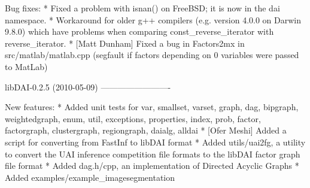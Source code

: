 \begin{DoxyVerbInclude}
Bug fixes:
* Fixed a problem with isnan() on FreeBSD; it is now in the dai namespace.
* Workaround for older g++ compilers (e.g. version 4.0.0 on Darwin 9.8.0)
  which have problems when comparing const_reverse_iterator with
  reverse_iterator.
* [Matt Dunham] Fixed a bug in Factors2mx in src/matlab/matlab.cpp
  (segfault if factors depending on 0 variables were passed to MatLab)


libDAI-0.2.5 (2010-05-09)
-------------------------

New features:
* Added unit tests for var, smallset, varset, graph, dag, bipgraph,
  weightedgraph, enum, util, exceptions, properties, index, prob, 
  factor, factorgraph, clustergraph, regiongraph, daialg, alldai
* [Ofer Meshi] Added a script for converting from FastInf to libDAI format
* Added utils/uai2fg, a utility to convert the UAI inference competition file
  formats to the libDAI factor graph file format
* Added dag.h/cpp, an implementation of Directed Acyclic Graphs
* Added examples/example_imagesegmentation


\end{DoxyVerbInclude}

